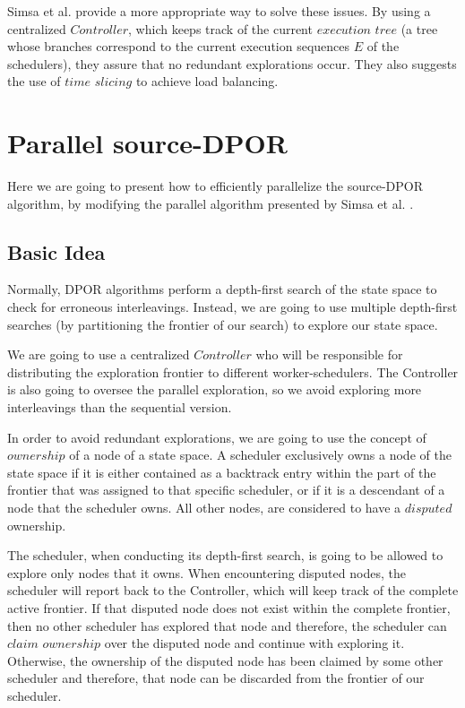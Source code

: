 Simsa et al. \cite{Simsa2012ScalableDP} provide
a more appropriate way to solve these issues. By using a centralized $Controller$, which keeps track of the current 
$execution$ $tree$ (a tree whose branches correspond to the current execution sequences $E$ of the schedulers), they assure that no redundant explorations occur. They also suggests the use of
$time$ $slicing$ to achieve load balancing.

\section{Parallel source-DPOR}

Here we are going to present how to efficiently parallelize the source-DPOR algorithm, by modifying the parallel algorithm 
presented by Simsa et al. \cite{Simsa2012ScalableDP}.

\subsection{Basic Idea}

Normally, DPOR algorithms perform a depth-first search of the state space to check for erroneous interleavings. Instead, we
are going to use multiple depth-first searches (by partitioning the frontier of our search) to explore our state space.

We are going to use a centralized $Controller$ who will be
responsible for distributing the exploration
frontier to different worker-schedulers. The Controller is
also going to oversee the parallel exploration, so we avoid exploring more interleavings than the sequential version.

In order to avoid redundant explorations, we are going to use the
concept of $ownership$ \cite{Simsa2012ScalableDP} of a node of a state space. A scheduler exclusively owns a node of the state space if it is
either contained  as a backtrack entry within the part of the frontier that was assigned 
to that specific scheduler, or if it is a descendant of a node
that the scheduler owns. All other nodes, are considered to have a
$disputed$ ownership. 

The scheduler, when conducting its depth-first search, is going to be
allowed to explore only nodes that it owns. When encountering disputed
nodes, the scheduler will report back to the Controller, which will 
keep track of the complete active frontier. If that disputed node
does not exist within the complete frontier, then no other 
scheduler has explored that node and therefore, the scheduler
can $claim$ $ownership$ over the disputed node and continue with 
exploring it. Otherwise, the ownership of the disputed node
has been claimed by some other scheduler and therefore, that node
can be discarded from the frontier of our scheduler.


